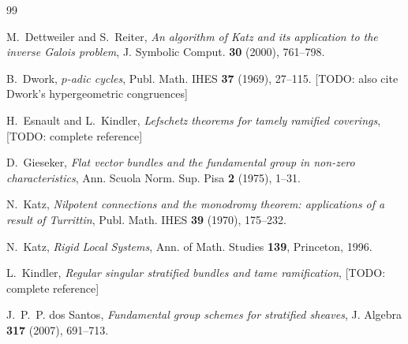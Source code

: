 \documentclass[11pt,reqno]{amsart}
\newcommand{\TODO}[1]{{\color{red}\textsf{[TODO: #1]}}}
\theoremstyle{plain}
\theoremstyle{definition}
\theoremstyle{remark}
\numberwithin{equation}{section}
\begin{document}
\begin{thebibliography}{99}

 M.~Dettweiler and S.~Reiter,
  \emph{An algorithm of Katz and its application to the inverse Galois
  problem}, J. Symbolic Comput. \textbf{30} (2000), 761--798.

 B.~Dwork,
  \emph{$p$-adic cycles}, Publ. Math. IHES \textbf{37} (1969), 27--115.
  \TODO{also cite Dwork's hypergeometric congruences}

 H.~Esnault and L.~Kindler,
  \emph{Lefschetz theorems for tamely ramified coverings},
  \TODO{complete reference}

 D.~Gieseker,
  \emph{Flat vector bundles and the fundamental group in non-zero
  characteristics},
  Ann. Scuola Norm. Sup. Pisa \textbf{2} (1975), 1--31.

 N.~Katz,
  \emph{Nilpotent connections and the monodromy theorem: applications of a
  result of Turrittin},
  Publ. Math. IHES \textbf{39} (1970), 175--232.

 N.~Katz,
  \emph{Rigid Local Systems}, Ann. of Math. Studies \textbf{139},
  Princeton, 1996.

 L.~Kindler,
  \emph{Regular singular stratified bundles and tame ramification},
  \TODO{complete reference}

 J.~P.~P. dos Santos,
  \emph{Fundamental group schemes for stratified sheaves},
  J. Algebra \textbf{317} (2007), 691--713.

\end{thebibliography}
\end{document}
